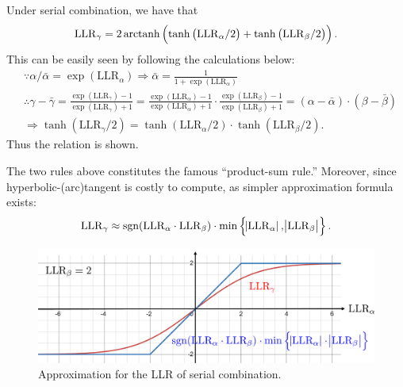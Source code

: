 Under serial combination, we have that
\begin{equation}
    \mathrm{LLR}_\gamma = 2 \operatorname{\mathrm{arctanh}}\left(\tanh\left(\mathrm{LLR}_\alpha/2\right) + \tanh\left(\mathrm{LLR}_\beta/2\right)\right).
\end{equation}
This can be easily seen by following the calculations below:
\begin{align*}
    &\because \alpha/\bar{\alpha} = \exp(\mathrm{LLR}_\alpha) \Rightarrow \bar{\alpha} = \frac{1}{1+\exp(\mathrm{LLR}_\alpha)} \\
    &\therefore \gamma-\bar{\gamma} = \frac{\exp(\mathrm{LLR}_\gamma) - 1}{\exp(\mathrm{LLR}_\gamma) + 1} = \frac{\exp(\mathrm{LLR}_\alpha) - 1}{\exp(\mathrm{LLR}_\alpha) + 1} \cdot \frac{\exp(\mathrm{LLR}_\beta) - 1}{\exp(\mathrm{LLR}_\beta) + 1} = (\alpha-\bar{\alpha})\cdot(\beta-\bar{\beta}) \\
    &\Rightarrow \tanh(\mathrm{LLR}_\gamma/2) = \tanh(\mathrm{LLR}_\alpha/2) \cdot \tanh(\mathrm{LLR}_\beta/2).
\end{align*}
Thus the relation is shown.

The two rules above constitutes the famous ``product-sum rule.'' Moreover, since hyperbolic-(arc)tangent is costly to compute, as simpler approximation formula exists:
\begin{equation}
    \mathrm{LLR}_\gamma \approx \mathrm{sgn(\mathrm{LLR}_\alpha\cdot\mathrm{LLR}_\beta}) \cdot \min\left\{\abs{\mathrm{LLR}_\alpha},\abs{\mathrm{LLR}_\beta}\right\}.
\end{equation}

\begin{figure}[H]
    \centering
    \includegraphics[width=0.7\linewidth]{figures/w5_approx_LLR.png}
    \caption{Approximation for the LLR of serial combination.}
\end{figure}

